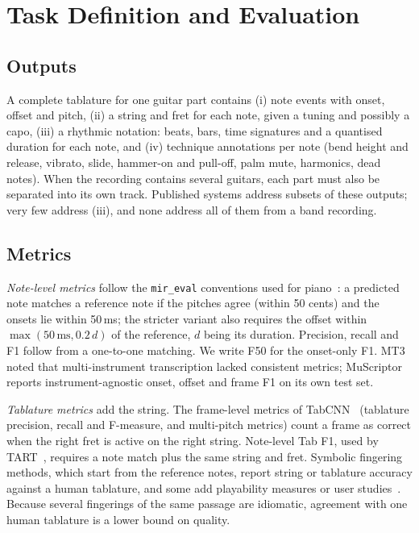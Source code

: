 \section{Task Definition and Evaluation}
\label{sec:task}

\subsection{Outputs}
A complete tablature for one guitar part contains (i) note events with onset,
offset and pitch, (ii) a string and fret for each note, given a tuning and
possibly a capo, (iii) a rhythmic notation: beats, bars, time signatures and a
quantised duration for each note, and (iv) technique annotations per note
(bend height and release, vibrato, slide, hammer-on and pull-off, palm mute,
harmonics, dead notes). When the recording contains several guitars, each
part must also be separated into its own track. Published systems address
subsets of these outputs; very few address (iii), and none address all of
them from a band recording.

\subsection{Metrics}
\emph{Note-level metrics} follow the \texttt{mir\_eval} conventions used for
piano~\cite{hawthorne2018onsets}: a predicted note matches a reference note if
the pitches agree (within 50 cents) and the onsets lie within 50\,ms; the
stricter variant also requires the offset within
$\max(50\,\text{ms}, 0.2\,d)$ of the reference, $d$ being its duration.
Precision, recall and F1 follow from a one-to-one matching. We write F50 for
the onset-only F1. MT3~\cite{gardner2022mt3} noted that multi-instrument
transcription lacked consistent metrics; MuScriptor~\cite{rouard2026muscriptor}
reports instrument-agnostic onset, offset and frame F1 on its own test set.

\emph{Tablature metrics} add the string. The frame-level metrics of
TabCNN~\cite{wiggins2019tabcnn} (tablature precision, recall and F-measure,
and multi-pitch metrics) count a frame as correct when the right fret is
active on the right string. Note-level Tab F1, used by
TART~\cite{gupta2026tart}, requires a note match plus the same string and
fret. Symbolic fingering methods, which start from the reference notes, report
string or tablature accuracy against a human tablature, and some add
playability measures or user
studies~\cite{edwards2024miditotab,hamberger2025fretting}. Because several
fingerings of the same passage are idiomatic, agreement with one human
tablature is a lower bound on quality.

